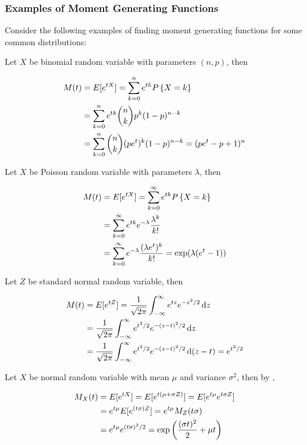 \documentclass[a4paper,12pt]{article}
\begin{document}
\subsubsection{Examples of Moment Generating Functions}
Consider the following examples of finding moment generating functions for some common distributions:\n

\begin{exm}
  Let $X$ be binomial random variable with parameters $(n,p)$, then

  $$\begin{aligned}[t]
    M(t)&=E[e^{tX}]=\sum_{k=0}^{n}e^{tk}P\left\{ X=k\right\}\\
    &=\sum_{k=0}^{n}e^{tk}\binom{n}{k}p^{k}(1-p)^{n-k}\\
    &=\sum_{k=0}^{n}\binom{n}{k}(pe^{t})^{k}(1-p)^{n-k}=(pe^{t}-p+1)^{n}
  \end{aligned}$$
\end{exm}\n

\begin{exm}
  Let $X$ be Poisson random variable with parameters $\lambda$, then

  $$\begin{aligned}[t]
    M(t)&=E[e^{tX}]=\sum_{k=0}^{\infty}e^{tk}P\left\{ X=k\right\}\\
    &=\sum_{k=0}^{\infty}e^{tk}e^{-\lambda}\frac{\lambda^{k}}{k!}\\
    &=\sum_{k=0}^{\infty}e^{-\lambda}\frac{(\lambda e^{t})^{k}}{k!}=\exp(\lambda(e^{t}-1))
  \end{aligned}$$
\end{exm}\n

\begin{exm}
  Let $Z$ be standard normal random variable, then

  $$\begin{aligned}[t]
    M(t)&=E[e^{tZ}]=\frac{1}{\sqrt{2\pi}}\int_{-\infty}^{\infty}e^{tz}e^{-z^{2}/2}\,\mathrm{d} z\\
    &=\frac{1}{\sqrt{2\pi}}\int_{-\infty}^{\infty}e^{t^{2}/2}e^{-(z-t)^{2}/2}\,\mathrm{d} z\\
    &=\frac{1}{\sqrt{2\pi}}\int_{-\infty}^{\infty}e^{t^{2}/2}e^{-(z-t)^{2}/2}\,\mathrm{d}(z-t)=e^{t^{2}/2}
  \end{aligned}$$
\end{exm}\n

\begin{exm}
  Let $X$ be normal random variable with mean $\mu$ and variance $\sigma^{2}$, then by \rexm[\sctr{1}],

  $$\begin{aligned}[t]
    M_{X}(t)&=E[e^{tX}]=E[e^{t(\mu+\sigma Z)}]=E[e^{t\mu}e^{t\sigma Z}]\\
    &=e^{t\mu}E[e^{(t\sigma)Z}]=e^{t\mu}M_{Z}(t\sigma)\\
    &=e^{t\mu}e^{(t\sigma)^{2}/2}=\exp\left( \frac{(\sigma t)^{2}}{2}+\mu t\right)
  \end{aligned}$$
\end{exm}
\end{document}
